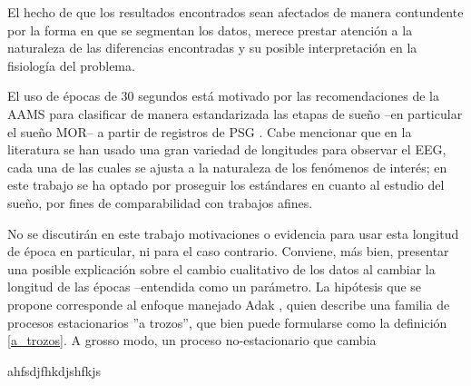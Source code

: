 El hecho de que los resultados encontrados sean afectados de manera contundente
por la forma en que se segmentan los
datos, merece prestar atenci\'on a la naturaleza de las diferencias encontradas y su 
posible interpretaci\'on en la fisiolog\'ia del problema.

El uso de \'epocas de 30 segundos est\'a motivado por las recomendaciones de la AAMS para 
clasificar de manera estandarizada las etapas de sue\~no --en particular el sue\~no MOR-- 
a partir de registros de PSG \cite{AASM07}. Cabe mencionar que 
en la literatura se han usado una gran variedad de
longitudes para observar el EEG, cada una de las cuales se ajusta a la naturaleza de los
fen\'omenos de inter\'es; en este trabajo se ha optado por proseguir los est\'andares en cuanto
al estudio del sue\~no, por fines de comparabilidad con trabajos afines.

No se discutir\'an en este trabajo motivaciones o evidencia para usar esta longitud de 
\'epoca en particular, ni para el caso contrario. Conviene, m\'as bien, presentar una posible
explicaci\'on sobre el cambio cualitativo de los datos al cambiar la longitud de las \'epocas
--entendida como un par\'ametro.
La hip\'otesis que se propone corresponde al enfoque manejado Adak \cite{Adak98}, 
quien describe una familia de procesos estacionarios ''a trozos'', que bien puede
formularse como la definici\'on \ref{a_trozos}. A grosso modo, un proceso no-estacionario
que cambia

\begin{defn}
ahfsdjfhkdjshfkjs
\label{a_trozos}
\end{defn}

